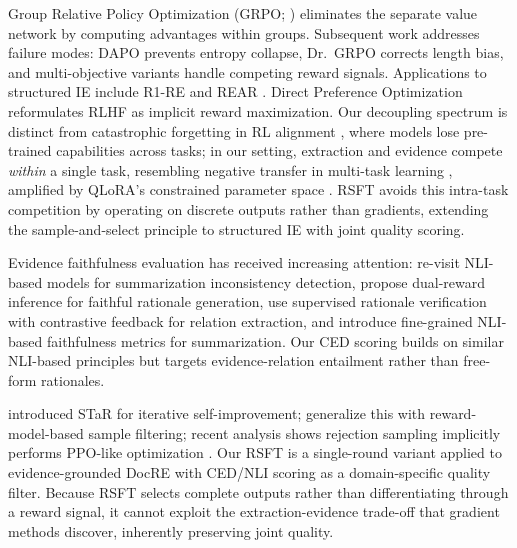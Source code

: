 Group Relative Policy Optimization (GRPO; \citealt{shao2024deepseekmath}) eliminates the separate value network by computing advantages within groups.
Subsequent work addresses failure modes: DAPO \citep{yu2025dapo} prevents entropy collapse, Dr.\ GRPO \citep{liu2025drgrpo} corrects length bias, and multi-objective variants \citep{liu2026gdpo,ito2025mogrpo} handle competing reward signals.
Applications to structured IE include R1-RE \citep{dai2025r1re} and REAR \citep{wang2025rear}.
Direct Preference Optimization \citep{rafailov2023direct} reformulates RLHF as implicit reward maximization.
Our decoupling spectrum is distinct from catastrophic forgetting in RL alignment \citep{jin2025rl_panacea}, where models lose pre-trained capabilities across tasks; in our setting, extraction and evidence compete \emph{within} a single task, resembling negative transfer in multi-task learning \citep{ruder2017overview,standley2020tasks,yu2020gradient}, amplified by QLoRA's constrained parameter space \citep{gao2023scaling,moskovitz2024constrained}.
RSFT avoids this intra-task competition by operating on discrete outputs rather than gradients, extending the sample-and-select principle \citep{wang2023selfconsistency} to structured IE with joint quality scoring.

Evidence faithfulness evaluation has received increasing attention: \citet{laban2022summac} re-visit NLI-based models for summarization inconsistency detection, \citet{li2025drift} propose dual-reward inference for faithful rationale generation, \citet{li2025srvf} use supervised rationale verification with contrastive feedback for relation extraction, and \citet{zhang2024infuse} introduce fine-grained NLI-based faithfulness metrics for summarization.
Our CED scoring builds on similar NLI-based principles but targets evidence-relation entailment rather than free-form rationales.

\citet{zelikman2022star} introduced STaR for iterative self-improvement; \citet{dong2023raft} generalize this with reward-model-based sample filtering; recent analysis shows rejection sampling implicitly performs PPO-like optimization \citep{tang2025rsftppo}.
Our RSFT is a single-round variant applied to evidence-grounded DocRE with CED/NLI scoring as a domain-specific quality filter.
Because RSFT selects complete outputs rather than differentiating through a reward signal, it cannot exploit the extraction-evidence trade-off that gradient methods discover, inherently preserving joint quality.

